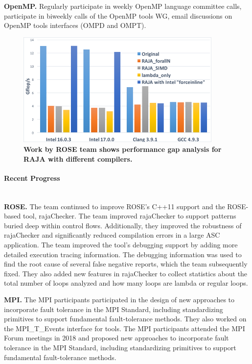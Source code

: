 \textbf{OpenMP.} Regularly participate in weekly OpenMP language committee calls, participate in biweekly calls of the OpenMP tools WG, email discussions on OpenMP tools interfaces (OMPD and OMPT).

\begin{figure}[htb]
        \centering
        \includegraphics[width=4in]{projects/2.3.6-NNSA/2.3.6.02-LLNL-ATDM/ROSE-raja}
        \caption{\label{fig:rose-raja}\textbf{Work by ROSE team shows
performance gap analysis for RAJA with different compilers.}}
\end{figure}




\paragraph{Recent Progress} \leavevmode \\



\textbf{ROSE.} The team continued to improve ROSE's C++11 support 
and the ROSE-based 
tool, rajaChecker. 
The team improved rajaChecker to support patterns buried deep within control 
flows. Additionally, they improved the robustness of rajaChecker and 
significantly reduced compilation errors in a large ASC application.
The team improved the tool's debugging support by adding more detailed
execution tracing information. The debugging information was used to
find the root cause of several false negative reports, which the team 
subsequently fixed. They also added new features in rajaChecker to
collect statistics about the total number of loops analyzed and how 
many loops are lambda or regular loops.



\textbf{MPI.} The MPI participants participated in the design of new 
approaches to incorporate fault tolerance in the MPI Standard, including 
standardizing primitives to support fundamental fault-tolerance methods.  
They also worked on the MPI\_T\_Events interface for tools.
The MPI participants attended the MPI Forum meetings in 2018
and proposed new approaches to incorporate fault tolerance in the 
MPI Standard, including standardizing primitives to support fundamental 
fault-tolerance methods.

